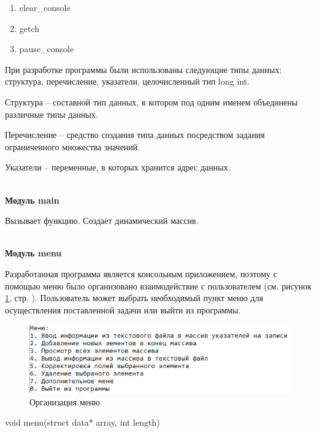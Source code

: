 \begin{enumerate}
    \item clear\_console
    \item getch
    \item pause\_console
\end{enumerate}

При разработке программы были использованы следующие типы данных: структура, перечисление, указатели, целочисленный тип long int.

Структура – составной тип данных, в котором под одним именем объединены различные типы данных.

Перечисление – средство создания типа данных посредством задания ограниченного множества значений.

Указатели – переменные, в которых хранится адрес данных.

\hspace{0pt}\\



\textbf{Модуль main}

Вызывает функцию. Создает динамический массив.

\hspace{0pt}\\



\textbf{Модуль menu}

Разработанная программа является консольным приложением, поэтому с помощью меню было организовано взаимодействие с пользователем (см. рисунок \ref{fig:menu}, стр. \pageref{fig:menu}). Пользователь может выбрать необходимый пункт меню для осуществления поставленной задачи или выйти из программы.

\begin{figure}[!hp]
    \begin{center}
        \includegraphics[width=14cm]{_input/programmDevelopment/menu.png}
    \end{center}
    \caption{Организация меню \label{fig:menu}}
\end{figure}

void menu(struct data* array, int length)

